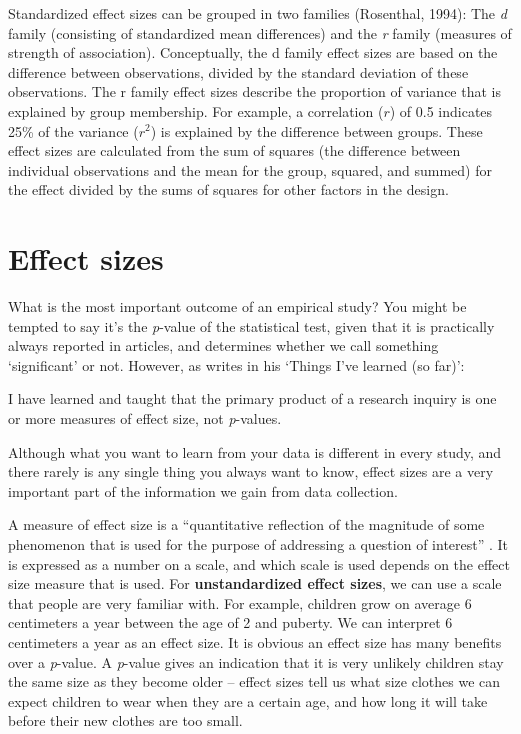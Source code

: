 \documentclass[
  oneside]{krantz}
\renewenvironment{quote}{\begin{VF}}{\end{VF}}
\begin{document}
Standardized effect sizes can be grouped in two families (Rosenthal, 1994): The \emph{d} family (consisting of standardized mean differences) and the \emph{r} family (measures of strength of association). Conceptually, the d family effect sizes are based on the difference between observations, divided by the standard deviation of these observations. The r family effect sizes describe the proportion of variance that is explained by group membership. For example, a correlation (\(r\)) of 0.5 indicates 25\% of the variance (\(r^2\)) is explained by the difference between groups. These effect sizes are calculated from the sum of squares (the difference between individual observations and the mean for the group, squared, and summed) for the effect divided by the sums of squares for other factors in the design.

\hypertarget{effect-sizes}{%
\section{Effect sizes}\label{effect-sizes}}

What is the most important outcome of an empirical study? You might be tempted to say it's the \emph{p}-value of the statistical test, given that it is practically always reported in articles, and determines whether we call something `significant' or not. However, as \citet{cohen_things_1990} writes in his `Things I've learned (so far)':

\begin{quote}
I have learned and taught that the primary product of a research inquiry is one or more measures of effect size, not \emph{p}-values.
\end{quote}

Although what you want to learn from your data is different in every study, and there rarely is any single thing you always want to know, effect sizes are a very important part of the information we gain from data collection.

A measure of effect size is a ``quantitative reflection of the magnitude of some phenomenon that is used for the purpose of addressing a question of interest'' \citep{kelley_effect_2012}. It is expressed as a number on a scale, and which scale is used depends on the effect size measure that is used. For \textbf{unstandardized effect sizes}, we can use a scale that people are very familiar with. For example, children grow on average 6 centimeters a year between the age of 2 and puberty. We can interpret 6 centimeters a year as an effect size. It is obvious an effect size has many benefits over a \emph{p}-value. A \emph{p}-value gives an indication that it is very unlikely children stay the same size as they become older -- effect sizes tell us what size clothes we can expect children to wear when they are a certain age, and how long it will take before their new clothes are too small.
\end{document}
